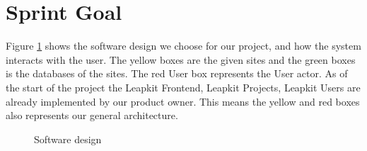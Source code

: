 \section{Sprint Goal}

Figure \ref{fig:design} shows the software design we choose for our
project, and how the system interacts with the user. The yellow boxes
are the given sites and the green boxes is the databases of the sites.
The red User box represents the User actor. As of the start of the project
the Leapkit Frontend, Leapkit Projects, Leapkit Users are already implemented by 
our product owner.
This means the yellow and red boxes also represents our general architecture.

\begin{figure}[h]
    \centering
    
    \caption{Software design}
    \label{fig:design}
\end{figure}
